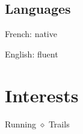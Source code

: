 \documentclass[]{deedy-resume-openfont}
\begin{document}
\begin{minipage}[t]{0.33\textwidth}
	\sectionsep
	\subsection{Languages}
	\vspace{\topsep}
	\begin{tightemize}
		\item French: native
		\item English: fluent
	\end{tightemize}


	\vspace{\topsep}
	\vspace{\topsep}
	\section{Interests}
	Running $\diamond$ Trails


\end{minipage}
\hfill
\end{document}
